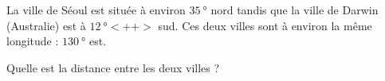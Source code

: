 
\begin{exercice}\label{exosmath-0467}

    La ville de Séoul est située à environ \(\SI{35}{\degree}\) nord tandis que la ville de Darwin (Australie) est à \( \SI{12}{\degree}<++>\) sud. Ces deux villes sont à environ la même longitude : \( \SI{130}{\degree}\) est.

    Quelle est la distance entre les deux villes ?

\end{exercice}
